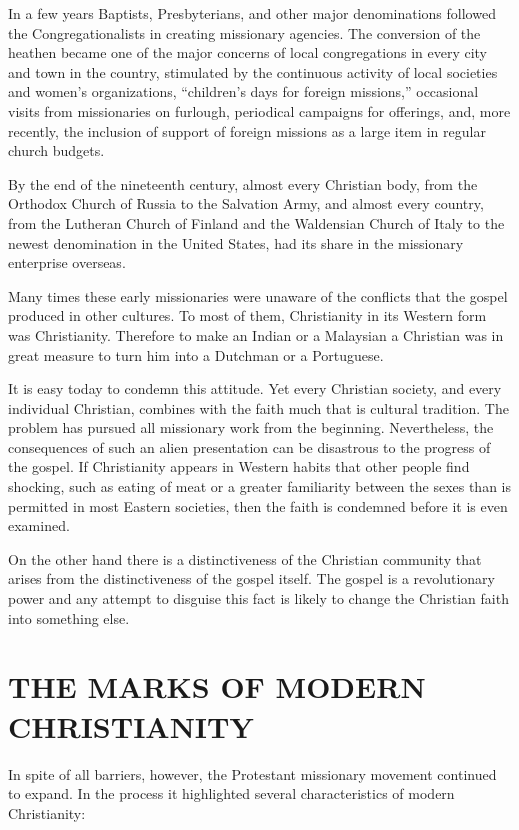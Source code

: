 In a few years Baptists, Presbyterians, and other major denominations followed the
Congregationalists in creating missionary agencies. The conversion of the heathen became one of the
major concerns of local congregations in every city and town in the country, stimulated by the
continuous activity of local societies and women’s organizations, “children’s days for foreign
missions,” occasional visits from missionaries on furlough, periodical campaigns for offerings, and,
more recently, the inclusion of support of foreign missions as a large item in regular church
budgets.

By the end of the nineteenth century, almost every Christian body, from the Orthodox Church of
Russia to the Salvation Army, and almost every country, from the Lutheran Church of Finland and the
Waldensian Church of Italy to the newest denomination in the United States, had its share in the
missionary enterprise overseas.

Many times these early missionaries were unaware of the conflicts that the gospel produced in other
cultures. To most of them, Christianity in its Western form was Christianity. Therefore to make an
Indian or a Malaysian a Christian was in great measure to turn him into a Dutchman or a Portuguese.

It is easy today to condemn this attitude. Yet every Christian society, and every individual
Christian, combines with the faith much that is cultural tradition. The problem has pursued all
missionary work from the beginning. Nevertheless, the consequences of such an alien presentation can
be disastrous to the progress of the gospel. If Christianity appears in Western habits that other
people find shocking, such as eating of meat or a greater familiarity between the sexes than is
permitted in most Eastern societies, then the faith is condemned before it is even examined.

On the other hand there is a distinctiveness of the Christian community that arises from the
distinctiveness of the gospel itself. The gospel is a revolutionary power and any attempt to
disguise this fact is likely to change the Christian faith into something else.

\section{THE MARKS OF MODERN CHRISTIANITY}

In spite of all barriers, however, the Protestant missionary movement continued to expand. In the
process it highlighted several characteristics of modern Christianity:

